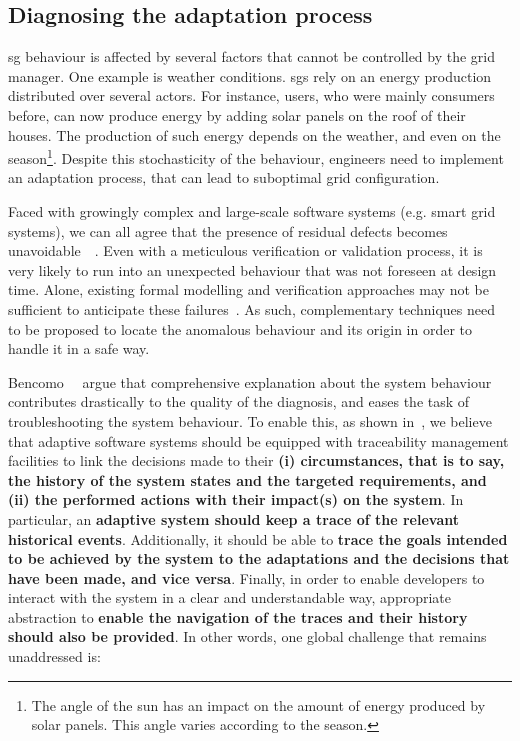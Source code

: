 \subsection{Diagnosing the adaptation process}
\label{sec:intro:challenges:diagnosis}

\Gls{sg} \gls{behaviour} is affected by several factors that cannot be controlled by the grid manager.
One example is weather conditions.
\Glspl{sg} rely on an energy production distributed over several actors.
For instance, users, who were mainly consumers before, can now produce energy by adding solar panels on the roof of their houses.
The production of such energy depends on the weather, and even on the season\footnote{The angle of the sun has an impact on the amount of energy produced by solar panels. This angle varies according to the season.}.
Despite this stochasticity of the \gls{behaviour}, engineers need to implement an adaptation process, that can lead to suboptimal grid configuration.

Faced with growingly complex and large-scale software systems (e.g. smart grid systems), we can all agree that the presence of residual defects becomes unavoidable~~\cite{DBLP:conf/icse/BarbosaLMJ17, DBLP:conf/icse/MongielloPS15, DBLP:conf/icse/HassanBB15}. 
Even with a meticulous verification or validation process, it is very likely to run into an unexpected behaviour that was not foreseen at design time. 
Alone, existing formal modelling and verification approaches may not be sufficient to anticipate these failures~\cite{DBLP:conf/icse/TaharaOH17}. 
As such, complementary techniques need to be proposed to locate the anomalous behaviour and its origin in order to handle it in a safe way.

Bencomo~\etal~\cite{DBLP:conf/iceccs/BencomoWSW12} argue that comprehensive explanation about the system behaviour contributes drastically to the quality of the diagnosis, and eases the task of troubleshooting the system behaviour. 
To enable this, as shown in~, we believe that adaptive software systems should be equipped with traceability management facilities to link the decisions made to their \textbf{(i) circumstances, that is to say, the history of the system states and the targeted requirements, and (ii) the performed actions with their impact(s) on the system}.
In particular, an \textbf{adaptive system should keep a trace of the relevant historical events}.
Additionally, it should be able to \textbf{trace the goals intended to be achieved by the system to the adaptations and the decisions that have been made, and vice versa}. 
Finally, in order to enable developers to interact with the system in a clear and understandable way, appropriate abstraction to \textbf{enable the navigation of the traces and their history should also be provided}.
In other words, one global challenge that remains unaddressed is:
\vspace{-2em}

